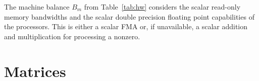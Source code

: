 The machine balance $B_m$ from Table~\ref{tab:hw} considers the scalar read-only
memory bandwidths and the scalar double precision floating point capabilities of
the processors. 
This is either a scalar FMA or, if unavailable, a scalar addition and
multiplication for processing a nonzero.

%



\section{Matrices}

